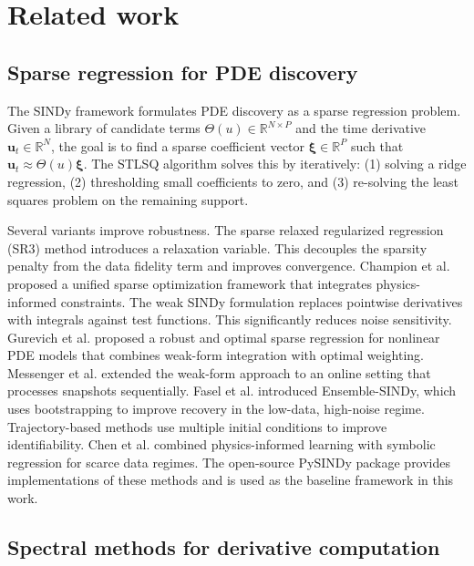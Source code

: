 \documentclass[preprint,12pt]{elsarticle}
\begin{document}
\section{Related work}
\label{sec:related}

\subsection{Sparse regression for PDE discovery}

The SINDy framework \cite{rudy2017data} formulates PDE discovery as a sparse regression problem. Given a library of candidate terms $\Theta(u) \in \mathbb{R}^{N \times P}$ and the time derivative $\mathbf{u}_t \in \mathbb{R}^N$, the goal is to find a sparse coefficient vector $\boldsymbol{\xi} \in \mathbb{R}^P$ such that $\mathbf{u}_t \approx \Theta(u)\boldsymbol{\xi}$. The STLSQ algorithm solves this by iteratively: (1) solving a ridge regression, (2) thresholding small coefficients to zero, and (3) re-solving the least squares problem on the remaining support.

Several variants improve robustness. The sparse relaxed regularized regression (SR3) method \cite{kaheman2020sindypi} introduces a relaxation variable. This decouples the sparsity penalty from the data fidelity term and improves convergence. Champion et al. \cite{champion2020unified} proposed a unified sparse optimization framework that integrates physics-informed constraints. The weak SINDy formulation \cite{messenger2021weak} replaces pointwise derivatives with integrals against test functions. This significantly reduces noise sensitivity. Gurevich et al. \cite{gurevich2019robust} proposed a robust and optimal sparse regression for nonlinear PDE models that combines weak-form integration with optimal weighting. Messenger et al. \cite{messenger2022online} extended the weak-form approach to an online setting that processes snapshots sequentially. Fasel et al. \cite{fasel2022ensemble} introduced Ensemble-SINDy, which uses bootstrapping to improve recovery in the low-data, high-noise regime. Trajectory-based methods \cite{kaptanoglu2022pde} use multiple initial conditions to improve identifiability. Chen et al. \cite{chen2021physics} combined physics-informed learning with symbolic regression for scarce data regimes. The open-source PySINDy package \cite{kaptanoglu2022pysindy} provides implementations of these methods and is used as the baseline framework in this work.

\subsection{Spectral methods for derivative computation}
\end{document}
